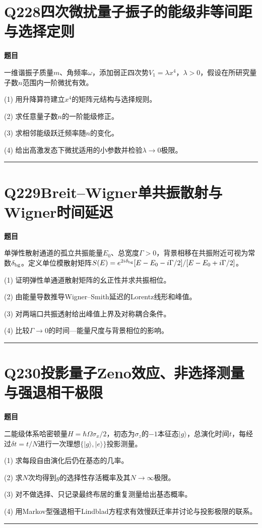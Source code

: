 \documentclass[UTF8,a4paper,11pt,oneside,openany]{ctexbook}
\begin{document}
\section*{Q228\quad 四次微扰量子振子的能级非等间距与选择定则}
\textbf{题目}\par
一维谐振子质量$m$、角频率$\omega$，添加弱正四次势$V_1=\lambda x^4$，$\lambda>0$，假设在所研究量子数$n$范围内一阶微扰有效。
\par\smallskip\noindent (1) 用升降算符建立$x^4$的矩阵元结构与选择规则。
\par\smallskip\noindent (2) 求任意量子数$n$的一阶能级修正。
\par\smallskip\noindent (3) 求相邻能级跃迁频率随$n$的变化。
\par\smallskip\noindent (4) 给出高激发态下微扰适用的小参数并检验$\lambda\to0$极限。
\par\medskip\hrule\medskip
\section*{Q229\quad Breit–Wigner单共振散射与Wigner时间延迟}
\textbf{题目}\par
单弹性散射通道的孤立共振能量$E_0$、总宽度$\Gamma>0$，背景相移在共振附近可视为常数$\delta_{\rm bg}$。定义单位模散射矩阵$S(E)=e^{2i\delta_{\rm bg}}[E-E_0-i\Gamma/2]/[E-E_0+i\Gamma/2]$。
\par\smallskip\noindent (1) 证明弹性单通道散射矩阵的幺正性并求共振相位。
\par\smallskip\noindent (2) 由能量导数推导Wigner–Smith延迟的Lorentz线形和峰值。
\par\smallskip\noindent (3) 对两端口共振透射给出峰值上界及对称耦合条件。
\par\smallskip\noindent (4) 比较$\Gamma\to0$的时间—能量尺度与背景相位的影响。
\par\medskip\hrule\medskip
\section*{Q230\quad 投影量子Zeno效应、非选择测量与强退相干极限}
\textbf{题目}\par
二能级体系哈密顿量$H=\hbar\Omega\sigma_x/2$，初态为$\sigma_z$的$-1$本征态$|g\rangle$，总演化时间$t$，每经过$\delta t=t/N$进行一次理想$\{|g\rangle,|e\rangle\}$投影测量。
\par\smallskip\noindent (1) 求每段自由演化后仍在基态的几率。
\par\smallskip\noindent (2) 求$N$次均得到$g$的选择性存活概率及其$N\to\infty$极限。
\par\smallskip\noindent (3) 对不做选择、只记录最终布居的重复测量给出基态概率。
\par\smallskip\noindent (4) 用Markov型强退相干Lindblad方程求有效慢跃迁率并讨论与投影极限的联系。
\par\medskip\hrule\medskip
\end{document}
